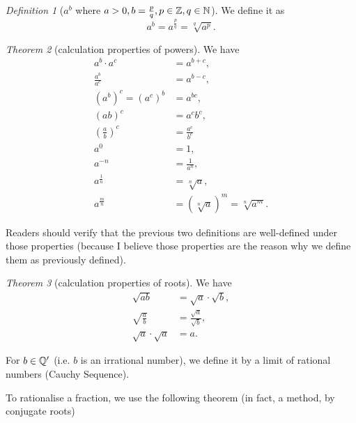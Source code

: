 \documentclass[8pt]{article}
\theoremstyle{remark}
\newtheorem{theorem}{Theorem}[section]
\newtheorem{definition}[theorem]{Definition}
\begin{document}
        \begin{definition}[$a^b$ where $a > 0, b = \frac{p}{q}, p \in \mathbb{Z}, q \in \mathbb{N}$]
            We define it as
            $$
                a^{b} = a^{\frac{p}{q}} = \sqrt[q]{a^p}.
            $$
        \end{definition}

        \begin{theorem}[calculation properties of powers]
            We have
            \begin{align*}
                a^b \cdot a^c &= a^{b + c},\\
                \frac{a^b}{a^c} &= a^{b - c},\\
                (a^b)^c = (a^c)^b &= a^{bc},\\
                (ab)^c &= a^c b^c,\\
                \left(\frac{a}{b}\right)^c &= \frac{a^c}{b^c}\\
                a^0 &= 1,\\
                a^{-n} &= \frac{1}{a^n},\\
                a^{\frac{1}{n}} &= \sqrt[n]{a},\\
                a^{\frac{m}{n}} &= \left(\sqrt[n]{a}\right)^m = \sqrt[n]{a^m}.
            \end{align*}

            Readers should verify that the previous two definitions are well-defined under those properties (because I believe those properties are the reason why we define them as previously defined).
        \end{theorem}

        \begin{theorem}[calculation properties of roots]
            We have
            \begin{align*}
                \sqrt{ab} &= \sqrt{a} \cdot \sqrt{b},\\
                \sqrt{\frac{a}{b}} &= \frac{\sqrt{a}}{\sqrt{b}},\\
                \sqrt{a} \cdot \sqrt{a} &= a.
            \end{align*}
        \end{theorem}

        For $ b \in \mathbb{Q}'$ (i.e. $b$ is an irrational number), we define it by a limit of rational numbers (Cauchy Sequence).

        To rationalise a fraction, we use the following theorem (in fact, a method, by conjugate roots)
        
\end{document}
